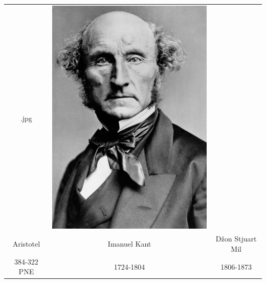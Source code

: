 \documentclass[a4paper]{article}
\begin{document}
\begin{table}[h!]
\begin{center}
\begin{tabular}{|c|c|c|}
.jpg} & \includegraphics[scale=.2]{slike/mil.jpg} \\Aristotel & Imanuel Kant & Džon Stjuart Mil\\ 384-322 PNE & 1724-1804 & 1806-1873\\ \hline \end{tabular}
\label{tab:tabela1}
\end{center}
\end{table}
\end{document}
